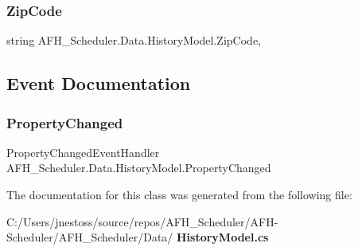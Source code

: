 \mbox{\label{class_a_f_h___scheduler_1_1_data_1_1_history_model_a53270376689afca58793e19e743cd13a}} 
\subsubsection{ZipCode}
{\footnotesize\ttfamily string A\+F\+H\+\_\+\+Scheduler.\+Data.\+History\+Model.\+Zip\+Code\hspace{0.3cm}{\ttfamily [get]}, {\ttfamily [set]}}



\subsection{Event Documentation}
\mbox{\label{class_a_f_h___scheduler_1_1_data_1_1_history_model_a1ee792f388ce6ecd52217cd764f4fc41}} 
\subsubsection{PropertyChanged}
{\footnotesize\ttfamily Property\+Changed\+Event\+Handler A\+F\+H\+\_\+\+Scheduler.\+Data.\+History\+Model.\+Property\+Changed}



The documentation for this class was generated from the following file\+:\begin{DoxyCompactItemize}
\item 
C\+:/\+Users/jnestoss/source/repos/\+A\+F\+H\+\_\+\+Scheduler/\+A\+F\+H-\/\+Scheduler/\+A\+F\+H\+\_\+\+Scheduler/\+Data/\textbf{ History\+Model.\+cs}\end{DoxyCompactItemize}
